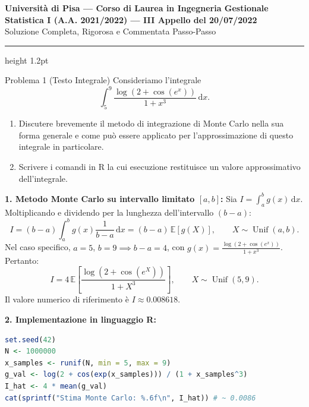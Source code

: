 \documentclass[11pt,a4paper]{article}
\newcommand{\EE}{\mathbb{E}}
\newcommand{\dx}{\mathrm{d}x}
\begin{document}
\begin{center}
    {\LARGE\bfseries\color{navyblue} Università di Pisa --- Corso di Laurea in Ingegneria Gestionale}\\[0.4em]
    {\Large\bfseries Statistica I (A.A. 2021/2022) --- III Appello del 20/07/2022}\\[0.3em]
    {\large\textsf{Soluzione Completa, Rigorosa e Commentata Passo-Passo}}
\end{center}
\vspace{0.5em}
\hrule height 1.2pt
\vspace{1.5em}

\begin{problemabox}{Problema 1 (Testo Integrale)}
Consideriamo l'integrale
\[
\int_5^9 \frac{\log(2 + \cos(e^x))}{1 + x^3} \, \dx.
\]
\begin{enumerate}[label=(\alph*)]
    \item Discutere brevemente il metodo di integrazione di Monte Carlo nella sua forma generale e come può essere applicato per l'approssimazione di questo integrale in particolare.
    \item Scrivere i comandi in R la cui esecuzione restituisce un valore approssimativo dell'integrale.
\end{enumerate}
\end{problemabox}

\begin{soluzionebox}
\textbf{1. Metodo Monte Carlo su intervallo limitato $[a, b]$:}
Sia $I = \int_a^b g(x) \, \dx$. Moltiplicando e dividendo per la lunghezza dell'intervallo $(b - a)$:
\[
I = (b - a) \int_a^b g(x) \frac{1}{b - a} \, \dx = (b - a) \, \EE[g(X)], \qquad X \sim \operatorname{Unif}(a, b).
\]
Nel caso specifico, $a = 5$, $b = 9 \implies b - a = 4$, con $g(x) = \frac{\log(2 + \cos(e^x))}{1 + x^3}$.
Pertanto:
\[
I = 4 \, \EE\left[ \frac{\log(2 + \cos(e^X))}{1 + X^3} \right], \qquad X \sim \operatorname{Unif}(5, 9).
\]
Il valore numerico di riferimento è $I \approx \mathbf{0.008618}$.

\textbf{2. Implementazione in linguaggio R:}
\begin{lstlisting}[language=R]
set.seed(42)
N <- 1000000
x_samples <- runif(N, min = 5, max = 9)
g_val <- log(2 + cos(exp(x_samples))) / (1 + x_samples^3)
I_hat <- 4 * mean(g_val)
cat(sprintf("Stima Monte Carlo: %.6f\n", I_hat)) # ~ 0.0086
\end{lstlisting}
\end{soluzionebox}
\end{document}
